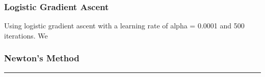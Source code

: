 \documentclass[paper=letter, fontsize=11pt]{scrartcl} %
\numberwithin{equation}{section} %
\newcommand{\horrule}[1]{\rule{\linewidth}{#1}} %
\begin{document}
\subsubsection{Logistic Gradient Ascent}
	Using logistic gradient ascent with a learning rate of alpha = 0.0001 and 500 iterations. We 
\subsubsection{Newton's Method}


\horrule{2pt} \\[0.3cm] %
\end{document}
